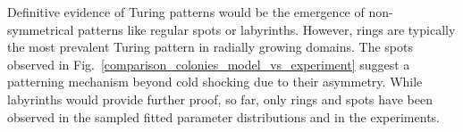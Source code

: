 Definitive evidence of Turing patterns would be the emergence of non-symmetrical patterns like regular spots or labyrinths.
However, rings are typically the most prevalent Turing pattern in radially growing domains\parencite{Konow2019}.
The spots observed in Fig.~\ref{comparison_colonies_model_vs_experiment} suggest a patterning mechanism beyond cold shocking due to their asymmetry.
While labyrinths would provide further proof, so far, only rings and spots have been observed in the sampled fitted parameter distributions and in the experiments.


